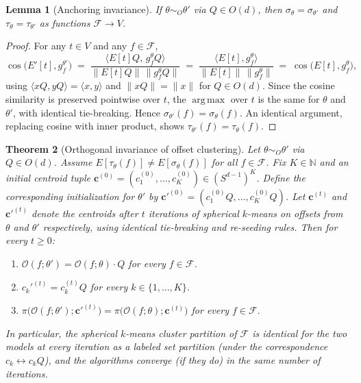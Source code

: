 \documentclass[11pt,letterpaper]{article}
\newtheorem{theorem}{Theorem}[section]
\newtheorem{lemma}[theorem]{Lemma}
\theoremstyle{definition}
\DeclareMathOperator*{\argmax}{arg\,max}
\DeclareMathOperator{\cossim}{cos}
\begin{document}
\begin{lemma}[Anchoring invariance]
\label{lem:anchoring}
If $\theta \sim_O \theta'$ via $Q \in O(d)$, then $\sigma_\theta = \sigma_{\theta'}$ and $\tau_\theta = \tau_{\theta'}$ as functions $\mathcal{F} \to V$.
\end{lemma}

\begin{proof}
For any $t \in V$ and any $f \in \mathcal{F}$,
\[
\cossim\!\big( E'[t], g_f^{\theta'} \big)
\;=\;
\frac{\big\langle E[t] Q, \, g_f^\theta Q \big\rangle}{\| E[t] Q \|\, \| g_f^\theta Q \|}
\;=\;
\frac{\big\langle E[t], g_f^\theta \big\rangle}{\| E[t] \|\, \| g_f^\theta \|}
\;=\; \cossim\!\big( E[t], g_f^\theta \big),
\]
using $\langle xQ, yQ \rangle = \langle x, y \rangle$ and $\|xQ\| = \|x\|$ for $Q \in O(d)$. Since the cosine similarity is preserved pointwise over $t$, the $\argmax$ over $t$ is the same for $\theta$ and $\theta'$, with identical tie-breaking. Hence $\sigma_{\theta'}(f) = \sigma_\theta(f)$. An identical argument, replacing cosine with inner product, shows $\tau_{\theta'}(f) = \tau_\theta(f)$.
\end{proof}

\begin{theorem}[Orthogonal invariance of offset clustering]
\label{thm:main}
Let $\theta \sim_O \theta'$ via $Q \in O(d)$. Assume $E[\tau_\theta(f)] \neq E[\sigma_\theta(f)]$ for all $f \in \mathcal{F}$. Fix $K \in \mathbb{N}$ and an initial centroid tuple $\mathbf{c}^{(0)} = (c_1^{(0)}, \ldots, c_K^{(0)}) \in (S^{d-1})^K$. Define the corresponding initialization for $\theta'$ by $\mathbf{c}'^{(0)} = (c_1^{(0)} Q, \ldots, c_K^{(0)} Q)$. Let $\mathbf{c}^{(t)}$ and $\mathbf{c}'^{(t)}$ denote the centroids after $t$ iterations of spherical $k$-means on offsets from $\theta$ and $\theta'$ respectively, using identical tie-breaking and re-seeding rules. Then for every $t \geq 0$:

\begin{enumerate}[label=(\roman*), itemsep=1pt]
\item $\mathcal{O}(f; \theta') = \mathcal{O}(f; \theta) \cdot Q$ for every $f \in \mathcal{F}$.
\item $c_k'^{(t)} = c_k^{(t)} Q$ for every $k \in \{1, \ldots, K\}$.
\item $\pi\big(\mathcal{O}(f; \theta'); \mathbf{c}'^{(t)}\big) = \pi\big(\mathcal{O}(f; \theta); \mathbf{c}^{(t)}\big)$ for every $f \in \mathcal{F}$.
\end{enumerate}

In particular, the spherical $k$-means cluster partition of $\mathcal{F}$ is identical for the two models at every iteration as a labeled set partition (under the correspondence $c_k \leftrightarrow c_k Q$), and the algorithms converge (if they do) in the same number of iterations.
\end{theorem}
\end{document}
